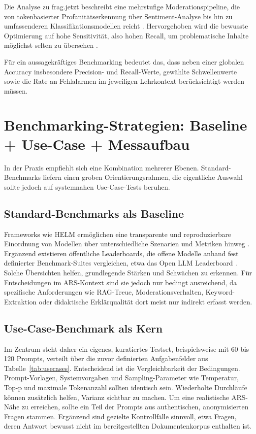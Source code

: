 Die Analyse zu frag.jetzt beschreibt eine mehrstufige Moderationspipeline, die von tokenbasierter Profanitätserkennung über Sentiment-Analyse bis hin zu umfassenderen Klassifikationsmodellen reicht \parencite{fragjetzt-analyse}. Hervorgehoben wird die bewusste Optimierung auf hohe Sensitivität, also hohen Recall, um problematische Inhalte möglichst selten zu übersehen \parencite{fragjetzt-analyse}. 

Für ein aussagekräftiges Benchmarking bedeutet das, dass neben einer globalen Accuracy insbesondere Precision- und Recall-Werte, gewählte Schwellenwerte sowie die Rate an Fehlalarmen im jeweiligen Lehrkontext berücksichtigt werden müssen.

\section{Benchmarking-Strategien: Baseline + Use-Case + Messaufbau}

In der Praxis empfiehlt sich eine Kombination mehrerer Ebenen. Standard-Benchmarks liefern einen groben Orientierungsrahmen, die eigentliche Auswahl sollte jedoch auf systemnahen Use-Case-Tests beruhen.

\subsection{Standard-Benchmarks als Baseline}

Frameworks wie HELM ermöglichen eine transparente und reproduzierbare Einordnung von Modellen über unterschiedliche Szenarien und Metriken hinweg \parencite{helm-paper,helm-site}. Ergänzend existieren öffentliche Leaderboards, die offene Modelle anhand fest definierter Benchmark-Suites vergleichen, etwa das Open LLM Leaderboard \parencite{hf-open-llm-leaderboard}. Solche Übersichten helfen, grundlegende Stärken und Schwächen zu erkennen. Für Entscheidungen im ARS-Kontext sind sie jedoch nur bedingt ausreichend, da spezifische Anforderungen wie RAG-Treue, Moderationsverhalten, Keyword-Extraktion oder didaktische Erklärqualität dort meist nur indirekt erfasst werden.

\subsection{Use-Case-Benchmark als Kern}

Im Zentrum steht daher ein eigenes, kuratiertes Testset, beispielsweise mit 60 bis 120 Prompts, verteilt über die zuvor definierten Aufgabenfelder aus Tabelle~\ref{tab:usecases}. Entscheidend ist die Vergleichbarkeit der Bedingungen. Prompt-Vorlagen, Systemvorgaben und Sampling-Parameter wie Temperatur, Top-p und maximale Tokenanzahl sollten identisch sein. Wiederholte Durchläufe können zusätzlich helfen, Varianz sichtbar zu machen. Um eine realistische ARS-Nähe zu erreichen, sollte ein Teil der Prompts aus authentischen, anonymisierten Fragen stammen. Ergänzend sind gezielte Kontrollfälle sinnvoll, etwa Fragen, deren Antwort bewusst nicht im bereitgestellten Dokumentenkorpus enthalten ist.

